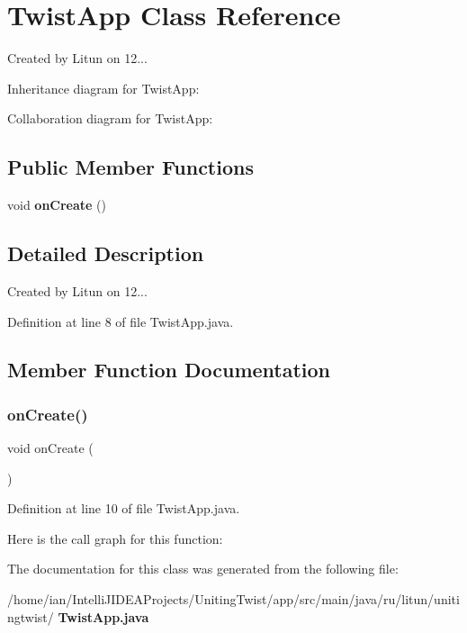 \section{Twist\+App Class Reference}
\label{classru_1_1litun_1_1unitingtwist_1_1_twist_app}


Created by Litun on 12...  




Inheritance diagram for Twist\+App\+:


Collaboration diagram for Twist\+App\+:
\subsection*{Public Member Functions}
\begin{DoxyCompactItemize}
\item 
void \textbf{ on\+Create} ()
\end{DoxyCompactItemize}


\subsection{Detailed Description}
Created by Litun on 12... 

Definition at line 8 of file Twist\+App.\+java.



\subsection{Member Function Documentation}
\mbox{\label{classru_1_1litun_1_1unitingtwist_1_1_twist_app_a664c1cf87598f75d568f4275bd61e074}} 
\subsubsection{on\+Create()}
{\footnotesize\ttfamily void on\+Create (\begin{DoxyParamCaption}{ }\end{DoxyParamCaption})}



Definition at line 10 of file Twist\+App.\+java.

Here is the call graph for this function\+:


The documentation for this class was generated from the following file\+:\begin{DoxyCompactItemize}
\item 
/home/ian/\+Intelli\+J\+I\+D\+E\+A\+Projects/\+Uniting\+Twist/app/src/main/java/ru/litun/unitingtwist/\textbf{ Twist\+App.\+java}\end{DoxyCompactItemize}

